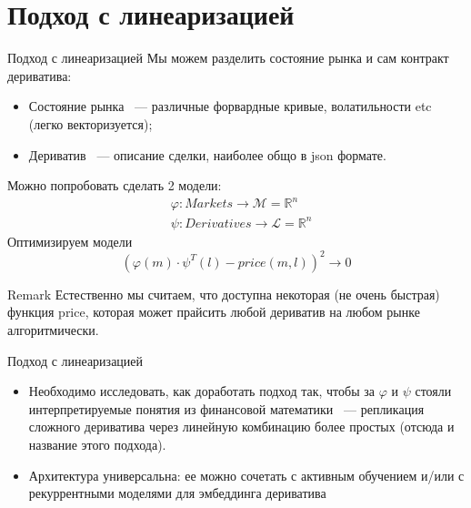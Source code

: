 \documentclass[10pt]{beamer}
\newcommand{\R}{\ensuremath{\mathbb{R}}}
\renewcommand{\phi}{\varphi}
\begin{document}
    \section{Подход с линеаризацией}
    \begin{frame}{Подход с линеаризацией}
        Мы можем разделить состояние рынка и сам контракт дериватива:
        \begin{itemize}
            \item Состояние рынка ~--- различные форвардные кривые, волатильности etc (легко векторизуется);
            \item Дериватив ~--- описание сделки, наиболее общо в json формате.
        \end{itemize}

        Можно попробовать сделать 2 модели:
        \begin{align*}
            & \phi: Markets \to \mathcal{M} = \R^n \\
            & \psi: Derivatives \to \mathcal{L} = \R^n
        \end{align*}
        Оптимизируем модели 
        \[
            \left( \phi(m) \cdot \psi^T(l) - price(m, l) \right)^2 \to 0
        \]

        \begin{block}{Remark}
            Естественно мы считаем, что доступна некоторая (не очень быстрая) функция price, которая может прайсить любой дериватив на любом рынке алгоритмически.
        \end{block}
    \end{frame}

    \begin{frame}{Подход с линеаризацией}
        \begin{itemize}
            \item Необходимо исследовать, как доработать подход так, чтобы за $\phi$ и $\psi$ стояли интерпретируемые понятия из финансовой математики 
            ~--- репликация сложного дериватива через линейную комбинацию более простых (отсюда и название этого подхода).
            \item Архитектура универсальна: ее можно сочетать с активным обучением и/или с рекуррентными моделями для эмбеддинга дериватива
        \end{itemize}
    \end{frame}
\end{document}
